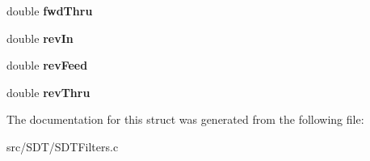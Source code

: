 \begin{DoxyCompactItemize}
\item 
\hypertarget{struct_s_d_t_waveguide_a89420deed8d8444fdb40b4a1759c0064}{}double {\bfseries fwd\+Thru}\label{struct_s_d_t_waveguide_a89420deed8d8444fdb40b4a1759c0064}

\item 
\hypertarget{struct_s_d_t_waveguide_a949b9bb7e0e4833e86d5bcdaa950ee0f}{}double {\bfseries rev\+In}\label{struct_s_d_t_waveguide_a949b9bb7e0e4833e86d5bcdaa950ee0f}

\item 
\hypertarget{struct_s_d_t_waveguide_a43cf7858389d792836aca8ada3701a51}{}double {\bfseries rev\+Feed}\label{struct_s_d_t_waveguide_a43cf7858389d792836aca8ada3701a51}

\item 
\hypertarget{struct_s_d_t_waveguide_a75c9bdf220a6d120bdb16847aeceba9d}{}double {\bfseries rev\+Thru}\label{struct_s_d_t_waveguide_a75c9bdf220a6d120bdb16847aeceba9d}

\end{DoxyCompactItemize}


The documentation for this struct was generated from the following file\+:\begin{DoxyCompactItemize}
\item 
src/\+S\+D\+T/S\+D\+T\+Filters.\+c\end{DoxyCompactItemize}
